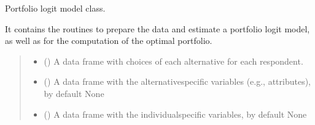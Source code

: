 \documentclass[a4paper,10pt,english]{sphinxhowto}
\begin{document}
\begin{fulllineitems}
\label{\detokenize{generated/portchoice.models:portchoice.models.PortLogit}}
\pysigstartsignatures
{}
\pysigstopsignatures
\sphinxAtStartPar
Portfolio logit model class.

\sphinxAtStartPar
It contains the routines to prepare the data and estimate a portfolio
logit model, as well as for the computation of the optimal portfolio.
\begin{quote}\begin{description}
\begin{itemize}
\item {} 
\sphinxAtStartPar
{} () \textendash{} A data frame with choices of each alternative for each respondent.

\item {} 
\sphinxAtStartPar
{} (\sphinxstyleliteralemphasis{\sphinxupquote{, }}) \textendash{} A data frame with the alternative\sphinxhyphen{}specific variables
(e.g., attributes), by default None

\item {} 
\sphinxAtStartPar
{} (\sphinxstyleliteralemphasis{\sphinxupquote{, }}) \textendash{} A data frame with the individual\sphinxhyphen{}specific variables, by default None


\end{itemize}
\end{description}
\end{quote}
\end{fulllineitems}
\end{document}
